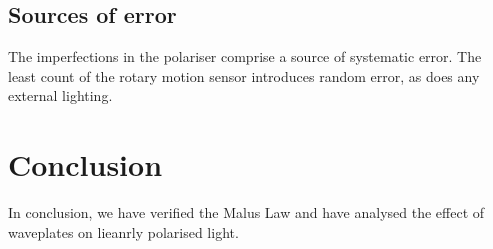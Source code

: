 \documentclass[11pt]{article}
\begin{document}
        \subsection{Sources of error}
        The imperfections in the polariser comprise a source of systematic error. The least count of the rotary motion sensor introduces
        random error, as does any external lighting.

        \section{Conclusion}
        In conclusion, we have verified the Malus Law and have analysed the effect of waveplates on lieanrly polarised light.

\end{document}
